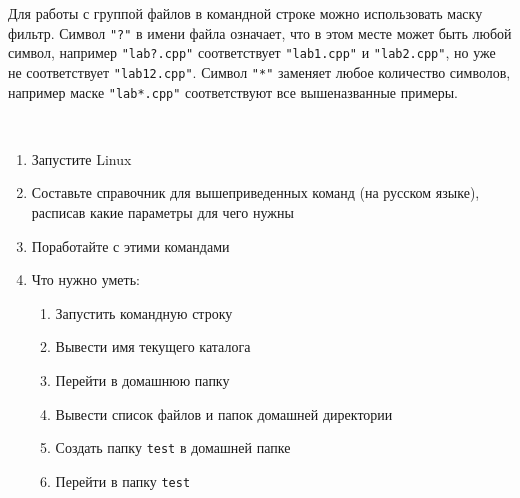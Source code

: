 \documentclass[a4paper,12pt]{article}
\begin{document}
    \begin{flushleft}
        Для работы с группой файлов в командной строке можно использовать маску фильтр. Символ \texttt{"?"} в имени файла означает, что в этом месте может быть любой символ, например \texttt{"lab?.cpp"} соответствует \texttt{"lab1.cpp"} и \texttt{"lab2.cpp"}, но уже не соответствует \texttt{"lab12.cpp"}. Символ \texttt{"*"} заменяет любое количество символов, например маске \texttt{"lab*.cpp"} соответствуют все вышеназванные примеры.
    \end{flushleft}

    \newpage

    \begin{flushleft}
         \\[0.5em]
        \begin{enumerate}
            \item Запустите Linux
            \item Составьте справочник для вышеприведенных команд (на русском языке), расписав какие параметры для чего нужны
            \item Поработайте с этими командами
            \item Что нужно уметь:
            \begin{enumerate} [\bf a. ]
                \item Запустить командную строку
                \item Вывести имя текущего каталога
                \begin{flushleft}
                \end{flushleft}
                \item Перейти в домашнюю папку
                \begin{flushleft}
                \end{flushleft}
                \item Вывести список файлов и папок домашней директории
                \begin{flushleft}
                \end{flushleft}
                \item Создать папку \texttt{test} в домашней папке
                \begin{flushleft}
                \end{flushleft}
                \item Перейти в папку \texttt{test}

\end{enumerate}
\end{enumerate}
\end{flushleft}
\end{document}
